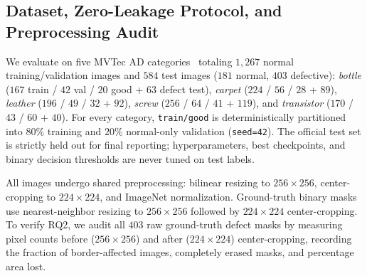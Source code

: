 \documentclass[conference]{IEEEtran}
\begin{document}
\subsection{Dataset, Zero-Leakage Protocol, and Preprocessing Audit}
We evaluate on five MVTec AD categories~\cite{bergmann2019mvtec} totaling $1{,}267$ normal training/validation images and $584$ test images ($181$ normal, $403$ defective): \textit{bottle} ($167$ train / $42$ val / $20$ good + $63$ defect test), \textit{carpet} ($224$ / $56$ / $28$ + $89$), \textit{leather} ($196$ / $49$ / $32$ + $92$), \textit{screw} ($256$ / $64$ / $41$ + $119$), and \textit{transistor} ($170$ / $43$ / $60$ + $40$). For every category, \texttt{train/good} is deterministically partitioned into $80\%$ training and $20\%$ normal-only validation (\texttt{seed=42}). The official test set is strictly held out for final reporting; hyperparameters, best checkpoints, and binary decision thresholds are never tuned on test labels.

All images undergo shared preprocessing: bilinear resizing to $256\times 256$, center-cropping to $224\times 224$, and ImageNet normalization. Ground-truth binary masks use nearest-neighbor resizing to $256\times 256$ followed by $224\times 224$ center-cropping. To verify RQ2, we audit all $403$ raw ground-truth defect masks by measuring pixel counts before ($256\times 256$) and after ($224\times 224$) center-cropping, recording the fraction of border-affected images, completely erased masks, and percentage area lost.
\end{document}
